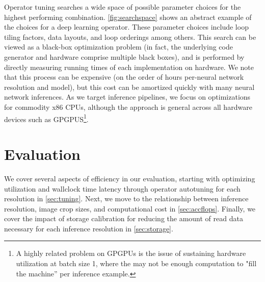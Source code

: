 Operator tuning searches a wide space of possible parameter choices for the highest performing combination.
\autoref{fig:searchspace} shows an abstract example of the choices for a deep learning operator.
These parameter choices include loop tiling factors, data layouts, and loop orderings among others.
This search can be viewed as a black-box optimization problem (in fact, the underlying code generator and hardware comprise multiple black boxes), and is performed by directly measuring running times of each implementation on hardware.
We note that this process can be expensive (on the order of hours per-neural network resolution and model), but this cost can be amortized quickly with many neural network inferences.
As we target inference pipelines, we focus on optimizations for commodity x86 CPUs, although the approach is general across all hardware devices such as GPGPUS\footnote{A highly related problem on GPGPUs is the issue of sustaining hardware utilization at batch size 1, where the may not be enough computation to "fill the machine'' per inference example.}.



\section{Evaluation}
We cover several aspects of efficiency in our evaluation, starting with optimizing utilization and wallclock time latency through operator autotuning for each resolution in \autoref{sec:tuning}.
Next, we move to the relationship between inference resolution, image crop sizes, and computational cost in \autoref{sec:accflops}.
Finally, we cover the impact of storage calibration for reducing the amount of read data necessary for each inference resolution in \autoref{sec:storage}.

